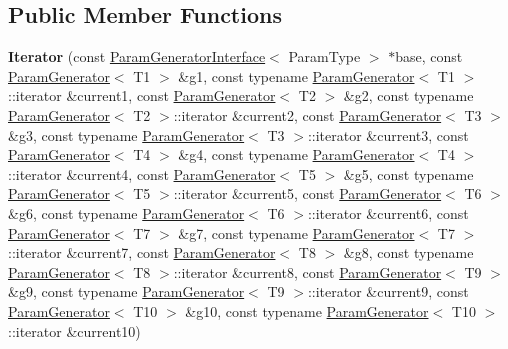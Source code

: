 \subsection*{Public Member Functions}
\begin{DoxyCompactItemize}
\item 
\mbox{\label{classtesting_1_1internal_1_1_cartesian_product_generator10_1_1_iterator_aee48be89323d6a9cd3d51f30a42817e6}} 
{\bfseries Iterator} (const \mbox{\hyperlink{classtesting_1_1internal_1_1_param_generator_interface}{Param\+Generator\+Interface}}$<$ Param\+Type $>$ $\ast$base, const \mbox{\hyperlink{classtesting_1_1internal_1_1_param_generator}{Param\+Generator}}$<$ T1 $>$ \&g1, const typename \mbox{\hyperlink{classtesting_1_1internal_1_1_param_generator}{Param\+Generator}}$<$ T1 $>$\+::iterator \&current1, const \mbox{\hyperlink{classtesting_1_1internal_1_1_param_generator}{Param\+Generator}}$<$ T2 $>$ \&g2, const typename \mbox{\hyperlink{classtesting_1_1internal_1_1_param_generator}{Param\+Generator}}$<$ T2 $>$\+::iterator \&current2, const \mbox{\hyperlink{classtesting_1_1internal_1_1_param_generator}{Param\+Generator}}$<$ T3 $>$ \&g3, const typename \mbox{\hyperlink{classtesting_1_1internal_1_1_param_generator}{Param\+Generator}}$<$ T3 $>$\+::iterator \&current3, const \mbox{\hyperlink{classtesting_1_1internal_1_1_param_generator}{Param\+Generator}}$<$ T4 $>$ \&g4, const typename \mbox{\hyperlink{classtesting_1_1internal_1_1_param_generator}{Param\+Generator}}$<$ T4 $>$\+::iterator \&current4, const \mbox{\hyperlink{classtesting_1_1internal_1_1_param_generator}{Param\+Generator}}$<$ T5 $>$ \&g5, const typename \mbox{\hyperlink{classtesting_1_1internal_1_1_param_generator}{Param\+Generator}}$<$ T5 $>$\+::iterator \&current5, const \mbox{\hyperlink{classtesting_1_1internal_1_1_param_generator}{Param\+Generator}}$<$ T6 $>$ \&g6, const typename \mbox{\hyperlink{classtesting_1_1internal_1_1_param_generator}{Param\+Generator}}$<$ T6 $>$\+::iterator \&current6, const \mbox{\hyperlink{classtesting_1_1internal_1_1_param_generator}{Param\+Generator}}$<$ T7 $>$ \&g7, const typename \mbox{\hyperlink{classtesting_1_1internal_1_1_param_generator}{Param\+Generator}}$<$ T7 $>$\+::iterator \&current7, const \mbox{\hyperlink{classtesting_1_1internal_1_1_param_generator}{Param\+Generator}}$<$ T8 $>$ \&g8, const typename \mbox{\hyperlink{classtesting_1_1internal_1_1_param_generator}{Param\+Generator}}$<$ T8 $>$\+::iterator \&current8, const \mbox{\hyperlink{classtesting_1_1internal_1_1_param_generator}{Param\+Generator}}$<$ T9 $>$ \&g9, const typename \mbox{\hyperlink{classtesting_1_1internal_1_1_param_generator}{Param\+Generator}}$<$ T9 $>$\+::iterator \&current9, const \mbox{\hyperlink{classtesting_1_1internal_1_1_param_generator}{Param\+Generator}}$<$ T10 $>$ \&g10, const typename \mbox{\hyperlink{classtesting_1_1internal_1_1_param_generator}{Param\+Generator}}$<$ T10 $>$\+::iterator \&current10)

\end{DoxyCompactItemize}
